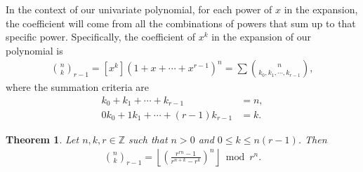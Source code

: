 \documentclass{article}
\theoremstyle{plain}
\newtheorem{theorem}{Theorem}
\theoremstyle{definition}
\newcommand{\floor}[1]{\left\lfloor #1 \right\rfloor}
\begin{document}
In the context of our univariate polynomial, for each power of \(x\) in the expansion, the coefficient will come from all the combinations of powers that sum up to that specific power. Specifically, the coefficient of \(x^k\) in the expansion of our polynomial is \cite{brualdi2010intro}
\begin{align*}
    \binom{n}{k}_{r-1} = [x^k](1 + x + \cdots + x^{r-1})^n = \sum \binom{n}{k_0, k_1, \cdots, k_{r-1}} ,
\end{align*}
where the summation criteria are
\begin{align*}
    k_0 + k_1 + \cdots + k_{r-1} &= n , \\
    0 k_0 + 1 k_1 + \cdots + (r-1) k_{r-1} &= k .
\end{align*}

\begin{theorem}
\label{proof:multinomialformula}
Let $n,k,r \in \mathbb{Z}$ such that $n > 0$ and $0 \leq k \leq n (r-1)$. Then
\begin{align*}
    \binom{n}{k}_{r-1} = \floor{\left(\frac{r^{rn} - 1}{r^{n+k} - r^k}\right)^n} \bmod r^n .
\end{align*}
\end{theorem}
\end{document}
